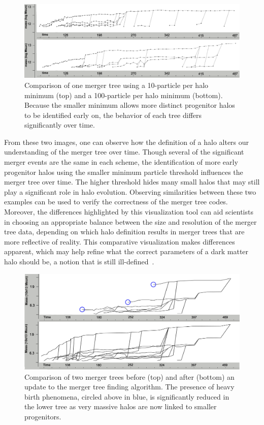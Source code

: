 	\begin{figure}[t]
		\includegraphics[width=\textwidth]{images/darkmatter/10_v_100_newest.png}
		\caption{Comparison of one merger tree using a 10-particle per halo minimum (top) and a 100-particle per halo minimum (bottom). Because the smaller minimum allows more distinct progenitor halos to be identified early on, the behavior of each tree differs significantly over time.}
		\label{fig:10vs100}
	\end{figure}

From these two images, one can observe how the definition of a halo alters our understanding of the merger tree over time. Though several of the significant merger events are the same in each scheme, the identification of more early progenitor halos using the smaller minimum particle threshold influences the merger tree over time. The higher threshold hides many small halos that may still play a significant role in halo evolution. Observing similarities between these two examples can be used to verify the correctness of the merger tree codes. Moreover, the differences highlighted by this visualization tool can aid scientists in choosing an appropriate balance between the size and resolution of the merger tree data, depending on which halo definition results in merger trees that are more reflective of reality. This comparative visualization makes differences apparent, which may help refine what the correct parameters of a dark matter halo should be, a notion that is still ill-defined~\cite{Knebe:2011}.

	\begin{figure}[t]
		\includegraphics[width=\textwidth]{images/darkmatter/old_vs_new_tree.png}
		\caption{Comparison of two merger trees before (top) and after (bottom) an update to the merger tree finding algorithm. The presence of heavy birth phenomena, circled above in blue, is significantly reduced in the lower tree as very massive halos are now linked to smaller progenitors.}
		\label{fig:oldvsnew}
	\end{figure}

